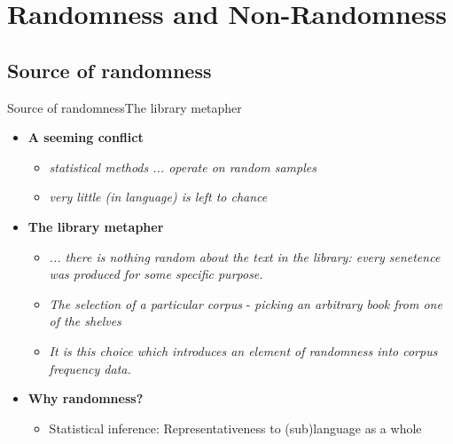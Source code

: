 %
%
%

\section{Randomness and Non-Randomness}
\subsection{Source of randomness}
\begin{frame}[t]{Source of randomness}{The library metapher}
	\begin{itemize}
		
		\item \textbf{A seeming conflict}
		\begin{itemize}
			\item \textit{statistical methods ... operate on random samples}
			\item \textit{very little (in language) is left to chance}
		\end{itemize}
		\bigbreak
			
		\item \textbf{The library metapher}
		\begin{itemize}
			\item \textit{... there is nothing random about the text in the library: every senetence was produced for some specific purpose.}
			\item \textit{The selection of a particular corpus} - \textit{picking an arbitrary book from one of the shelves}
			\item \textit{It is this choice which introduces an element of randomness into corpus frequency data.}
		\end{itemize}
		\bigbreak
		
		\item \textbf{Why randomness?}
		\begin{itemize}
			\item Statistical inference: Representativeness to (sub)language as a whole
		\end{itemize}
		
	\end{itemize}
\end{frame}

